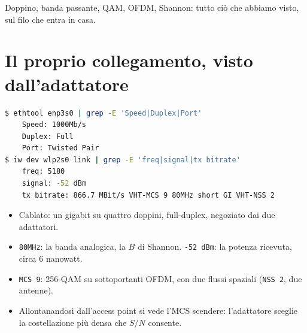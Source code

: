 Doppino, banda passante, QAM, OFDM, Shannon: tutto ciò che abbiamo visto, sul filo che entra in casa.

\section{Il proprio collegamento, visto dall'adattatore}

\begin{lstlisting}[language=bash]
$ ethtool enp3s0 | grep -E 'Speed|Duplex|Port'
    Speed: 1000Mb/s
    Duplex: Full
    Port: Twisted Pair
$ iw dev wlp2s0 link | grep -E 'freq|signal|tx bitrate'
    freq: 5180
    signal: -52 dBm
    tx bitrate: 866.7 MBit/s VHT-MCS 9 80MHz short GI VHT-NSS 2
\end{lstlisting}

\begin{itemize}
    \item Cablato: un gigabit su quattro doppini, full-duplex, negoziato dai due adattatori.
    \item \texttt{80MHz}: la banda analogica, la $B$ di Shannon. \texttt{-52 dBm}: la potenza ricevuta, circa 6 nanowatt.
    \item \texttt{MCS 9}: 256-QAM su sottoportanti OFDM, con due flussi spaziali (\texttt{NSS 2}, due antenne).
    \item Allontanandosi dall'access point si vede l'MCS scendere: l'adattatore sceglie la costellazione più densa che $S/N$ consente.
\end{itemize}

